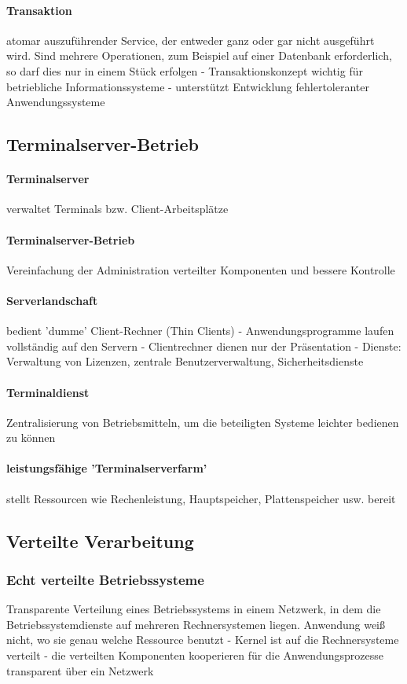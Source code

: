 \documentclass[11pt,a4paper,landscape]{article}
\begin{document}
\begin{multicols*}{3}
	\paragraph{Transaktion} atomar auszuführender Service, der entweder ganz oder gar nicht ausgeführt wird. Sind mehrere Operationen, zum Beispiel auf einer Datenbank erforderlich, so darf dies nur in einem Stück erfolgen - Transaktionskonzept wichtig für betriebliche Informationssysteme - unterstützt Entwicklung fehlertoleranter Anwendungssysteme
	\subsection{Terminalserver-Betrieb}
	\paragraph{Terminalserver} verwaltet Terminals bzw. Client-Arbeitsplätze
	\paragraph{Terminalserver-Betrieb} Vereinfachung der Administration verteilter Komponenten und bessere Kontrolle
	\paragraph{Serverlandschaft} bedient 'dumme' Client-Rechner (Thin Clients) - Anwendungsprogramme laufen vollständig auf den Servern - Clientrechner dienen nur der Präsentation - Dienste: Verwaltung von Lizenzen, zentrale Benutzerverwaltung, Sicherheitsdienste
	\paragraph{Terminaldienst} Zentralisierung von Betriebsmitteln, um die beteiligten Systeme leichter bedienen zu können
	\paragraph{leistungsfähige 'Terminalserverfarm'} stellt Ressourcen wie Rechenleistung, Hauptspeicher, Plattenspeicher usw. bereit
	\subsection{Verteilte Verarbeitung}
	\subsubsection{Echt verteilte Betriebssysteme}
	Transparente Verteilung eines Betriebssystems in einem Netzwerk, in dem die Betriebssystemdienste auf mehreren Rechnersystemen liegen. Anwendung weiß nicht, wo sie genau welche Ressource benutzt - Kernel ist auf die Rechnersysteme verteilt - die verteilten Komponenten kooperieren für die Anwendungsprozesse transparent über ein Netzwerk

\end{multicols*}
\end{document}
